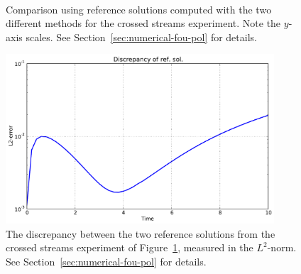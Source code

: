 \begin{figure}
\centering
{} \\
\caption{Comparison using reference solutions computed with the two different methods for the crossed streams
experiment. Note the $y$-axis scales. See Section~\vref{sec:numerical-fou-pol} for details.}
\label{fig:numpol-compare}
\end{figure}

\begin{figure}
    \centering
    \includegraphics[width=10cm]{figs/polboltz/compare-both}
    \caption{The discrepancy between the two reference solutions from the crossed streams experiment of
    Figure~\ref{fig:numpol-compare}, measured in the $L^2$-norm. See Section~\vref{sec:numerical-fou-pol} for
    details.}
    \label{fig:numpol-compare-disc}
\end{figure}


